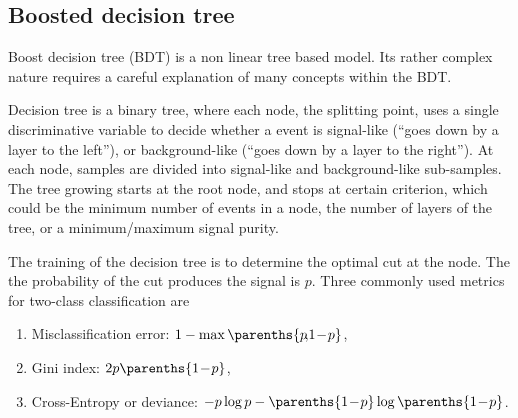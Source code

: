 \subsection{Boosted decision tree}
\label{sec:analysisBDT}
Boost decision tree (BDT) is a non linear tree based model. Its rather complex nature requires a careful explanation of many concepts within the BDT.

Decision tree is a binary tree, where each node, the splitting point, uses a single discriminative variable to decide whether a event is signal-like (``goes down by a layer to the left''), or background-like (``goes down by a layer to the right''). At each node, samples are divided into signal-like and background-like sub-samples. The tree growing starts at the root node, and stops at certain criterion, which could be the minimum number of events in a node, the number of layers of the tree, or a minimum/maximum signal purity.

The training of the decision tree is to determine the optimal cut at the node. The the probability of the cut produces the signal is $p$. Three commonly used metrics for two-class classification are
\begin{enumerate}
\item Misclassification error:  $1 - \max\parenths{p\!,\!1\!-\!p}$,
\item Gini index: $2p\parenths{1\!-\!p}$,
\item Cross-Entropy or deviance: $-p\log{p}-\parenths{1\!-\!p}\log\parenths{1\!-\!p}$.
\end{enumerate}

